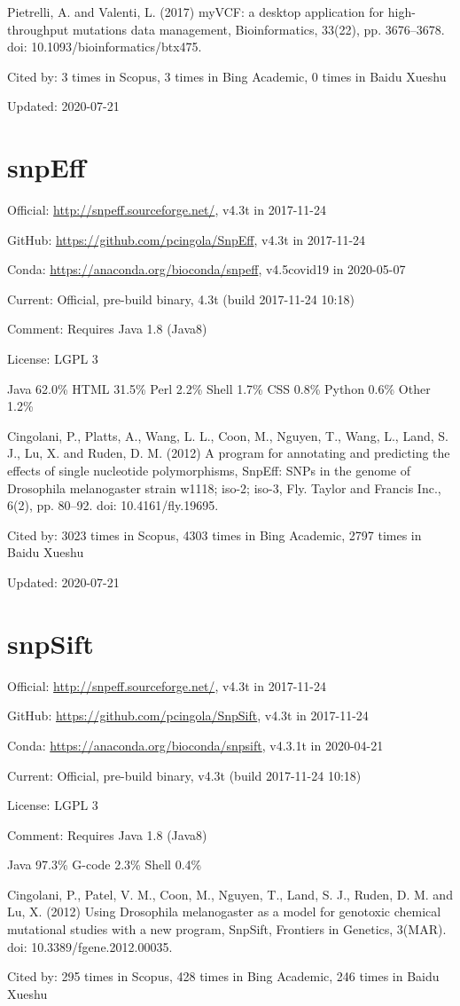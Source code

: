 \documentclass[]{article}
\newcommand{\cb}[3]{\par Cited by: {\color{blue}\Huge #1} times in Scopus, {\color{blue}\Huge #2} times in Bing Academic, {\color{blue}\Huge #3} times in Baidu Xueshu}
\begin{document}
Pietrelli, A. and Valenti, L. (2017) myVCF: a desktop application for high-throughput mutations data management, Bioinformatics, 33(22), pp. 3676–3678. doi: 10.1093/bioinformatics/btx475.\cb{3}{3}{0}

Updated: 2020-07-21
\section{snpEff}

Official: \url{http://snpeff.sourceforge.net/}, v4.3t in 2017-11-24

GitHub: \url{https://github.com/pcingola/SnpEff}, v4.3t in 2017-11-24

Conda: \url{https://anaconda.org/bioconda/snpeff}, v4.5covid19 in 2020-05-07

Current: Official, pre-build binary, 4.3t (build 2017-11-24 10:18)

Comment: Requires Java 1.8 (Java8)

License: LGPL 3

Java 62.0\% HTML 31.5\% Perl 2.2\% Shell 1.7\% CSS 0.8\% Python 0.6\% Other 1.2\%

Cingolani, P., Platts, A., Wang, L. L., Coon, M., Nguyen, T., Wang, L., Land, S. J., Lu, X. and Ruden, D. M. (2012) A program for annotating and predicting the effects of single nucleotide polymorphisms, SnpEff: SNPs in the genome of Drosophila melanogaster strain w1118; iso-2; iso-3, Fly. Taylor and Francis Inc., 6(2), pp. 80–92. doi: 10.4161/fly.19695.\cb{3023}{4303}{2797}

Updated: 2020-07-21

\section{snpSift}

Official: \url{http://snpeff.sourceforge.net/}, v4.3t in 2017-11-24

GitHub: \url{https://github.com/pcingola/SnpSift}, v4.3t in 2017-11-24

Conda: \url{https://anaconda.org/bioconda/snpsift}, v4.3.1t in 2020-04-21

Current: Official, pre-build binary, v4.3t (build 2017-11-24 10:18)

License: LGPL 3

Comment: Requires Java 1.8 (Java8)

Java 97.3\% G-code 2.3\% Shell 0.4\%

Cingolani, P., Patel, V. M., Coon, M., Nguyen, T., Land, S. J., Ruden, D. M. and Lu, X. (2012) Using Drosophila melanogaster as a model for genotoxic chemical mutational studies with a new program, SnpSift, Frontiers in Genetics, 3(MAR). doi: 10.3389/fgene.2012.00035.\cb{295}{428}{246}
\end{document}
